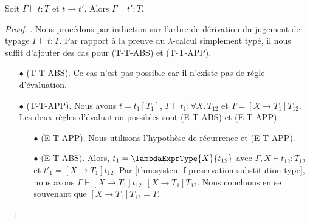 \begin{theorem} 
  \label{thm:system-f-preservation}
  Soit $\Gamma \vdash t : T$ et $t \rightarrow t'$. Alors $\Gamma \vdash t' :
  T$.
\end{theorem}

\begin{proof}
  \label{thm:system-f-preservation-proof}. Nous procédons par induction sur
  l'arbre de dérivation du jugement de typage $\Gamma \vdash t : T$. Par rapport
  à la preuve du $\lambda$-calcul simplement typé, il nous
  suffit d'ajouter des cas pour (T-T-ABS) et (T-T-APP).

  \begin{itemize}
  \item[$\bullet$] (T-T-ABS). Ce cas n'est pas possible car il n'existe pas de règle d'évaluation.
  \item[$\bullet$] (T-T-APP). Nous avons $t = t_{1}[T_{1}]$, $\Gamma \vdash
    t_{1} : \forall X . \, T_{12}$ et $T = [X \rightarrow T_{1}] T_{12}$. Les deux
    règles d'évaluation possibles sont (E-T-ABS) et (E-T-APP).
    \begin{itemize}
    \item[$\bullet$] (E-T-APP). Nous utilisons l'hypothèse de récurrence et (E-T-APP).
    \item[$\bullet$] (E-T-ABS). Alors, $t_{1} = \lambdaExprType{X}{t_{12}}$ avec $\Gamma, X
      \vdash t_{12} : T_{12}$ et $t'_{1} = [X \rightarrow T_{1}] t_{12}$. Par
     \ref{thm:system-f-preservation-substitution-type}, nous avons $\Gamma \vdash
     [X \rightarrow T_{1}] t_{12} : [X \rightarrow T_{1}] T_{12}$. Nous concluons
     en se souvenant que $[X \rightarrow T_{1}]T_{12} = T$.
    \end{itemize}
  \end{itemize}
\end{proof}
